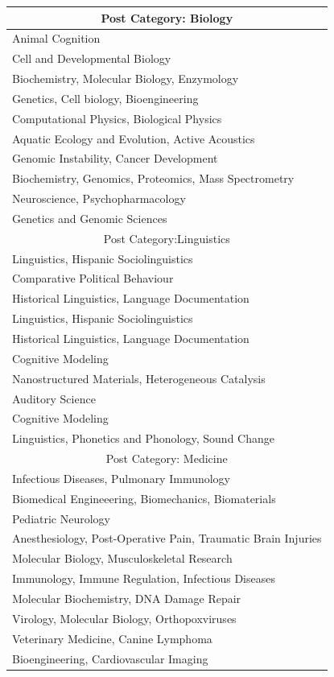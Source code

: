 \begin{spacing}{1}
\begin{longtable}{l}
\multicolumn{1}{c}{Post Category: Biology} \\ \hline
Animal Cognition  \\
Cell and Developmental Biology  \\
Biochemistry, Molecular Biology, Enzymology  \\
Genetics, Cell biology, Bioengineering \\
Computational Physics, Biological Physics \\
Aquatic Ecology and Evolution, Active Acoustics \\
Genomic Instability, Cancer Development \\
Biochemistry, Genomics, Proteomics, Mass Spectrometry \\
Neuroscience, Psychopharmacology \\
Genetics and Genomic Sciences \\
\hline
\multicolumn{1}{c}{{Post Category:Linguistics}} \\ \hline
Linguistics, Hispanic Sociolinguistics  \\
Comparative Political Behaviour \\
Historical Linguistics, Language Documentation \\
Linguistics, Hispanic Sociolinguistics \\
Historical Linguistics, Language Documentation  \\
Cognitive Modeling \\
Nanostructured Materials, Heterogeneous Catalysis \\
Auditory Science  \\
Cognitive Modeling \\
Linguistics, Phonetics and Phonology, Sound Change \\
\hline

\multicolumn{1}{c}{{Post Category: Medicine}} \\ \hline
Infectious Diseases, Pulmonary Immunology \\
Biomedical Engineeering, Biomechanics, Biomaterials \\
Pediatric Neurology \\
Anesthesiology, Post-Operative Pain, Traumatic Brain Injuries \\
Molecular Biology, Musculoskeletal Research \\
Immunology, Immune Regulation, Infectious Diseases  \\
Molecular Biochemistry, DNA Damage Repair \\
Virology, Molecular Biology, Orthopoxviruses \\
Veterinary Medicine, Canine Lymphoma \\
Bioengineering, Cardiovascular Imaging  \\
\hline


\end{longtable}
\end{spacing}
